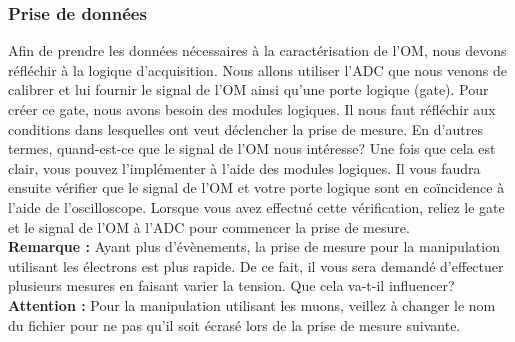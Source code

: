 
\subsubsection{Prise de données}

Afin de prendre les données nécessaires à la caractérisation de l'OM, nous devons réfléchir à la logique d'acquisition. Nous allons utiliser l'ADC que nous venons de calibrer et lui fournir le signal de l'OM ainsi qu'une porte logique (gate). Pour créer ce gate, nous avons besoin des modules logiques. Il nous faut réfléchir aux conditions dans lesquelles ont veut déclencher la prise de mesure. En d'autres termes, quand-est-ce que le signal de l'OM nous intéresse? Une fois que cela est clair, vous pouvez l'implémenter à l'aide des modules logiques. Il vous faudra ensuite vérifier que le signal de l'OM et votre porte logique sont en coïncidence à l'aide de l'oscilloscope. Lorsque vous avez effectué cette vérification, reliez le gate et le signal de l'OM à l'ADC pour commencer la prise de mesure.\\

\textbf{Remarque :} Ayant plus d'évènements, la prise de mesure pour la manipulation utilisant les électrons est plus rapide. De ce fait, il vous sera demandé d'effectuer plusieurs mesures en faisant varier la tension. Que cela va-t-il influencer? \\

\textbf{Attention :} Pour la manipulation utilisant les muons, veillez à changer le nom du fichier pour ne pas qu'il soit écrasé lors de la prise de mesure suivante.


